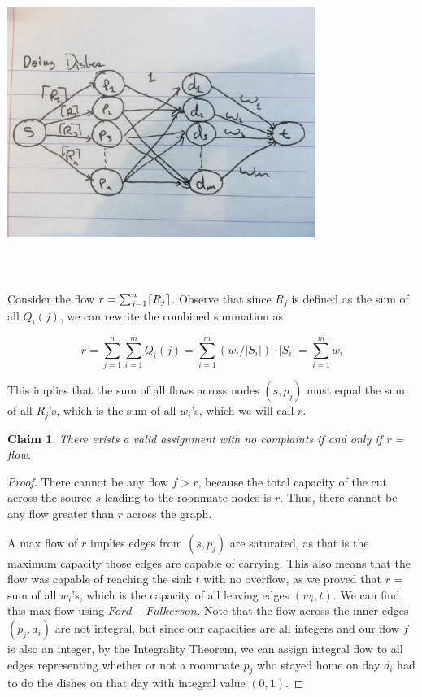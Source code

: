 \documentclass[11pt]{article}
\newtheorem{claim}[theorem]{Claim}
\DeclarePairedDelimiter\ceil{\lceil}{\rceil}
\begin{document}
\begin{center}
\includegraphics[width=10cm,height=10cm,keepaspectratio]{q1_dishes}
\end{center}

Consider the flow $r = \sum_{j=1}^{n}\ceil{R_j}$. Observe that since $R_j$ is defined as the sum of all $Q_i(j)$, we can rewrite the combined summation as 

\begin{equation}
r = \sum_{j = 1}^{n}\sum_{i=1}^{m}Q_i(j) = \sum_{i=1}^{m} (w_i/|S_i|) \cdot |S_i| = \sum_{i=1}^{m} w_i
\end{equation}

This implies that the sum of all flows across nodes $(s, p_j)$ must equal the sum of all $R_j$'s, which is the sum of all $w_i$'s, which we will call $r$.

\begin{claim}
There exists a valid assignment with no complaints if and only if r = flow.
\end{claim}
\begin{proof}
There cannot be any flow $f > r$, because the total capacity of the cut across the source $s$ leading to the roommate nodes is $r$. Thus, there cannot be any flow greater than $r$ across the graph.

A max flow of $r$ implies edges from $(s, p_j)$ are saturated, as that is the maximum capacity those edges are capable of carrying.
This also means that the flow was capable of reaching the sink $t$ with no overflow, as we proved that $r$ = sum of all $w_i$'s, which is the capacity of all leaving edges $(w_i, t)$. We can find this max flow using $Ford-Fulkerson$. Note that the flow across the inner edges $(p_j, d_i)$ are not integral, but since our capacities are all integers and our flow $f$ is also an integer, by the Integrality Theorem, we can assign integral flow to all edges representing whether or not a roommate $p_j$ who stayed home on day $d_i$ had to do the dishes on that day with integral value $(0, 1)$.
\end{proof}
\end{document}
